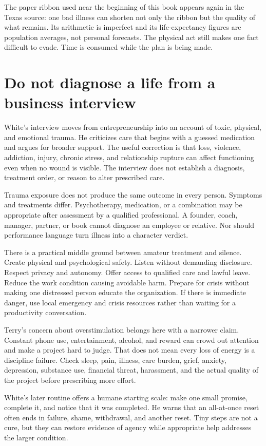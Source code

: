 The paper ribbon used near the beginning of this book appears again in the
Texas source: one bad illness can shorten not only the ribbon but the quality
of what remains. Its arithmetic is imperfect and its life-expectancy figures
are population averages, not personal forecasts. The physical act still makes
one fact difficult to evade. Time is consumed while the plan is being made.

\section{Do not diagnose a life from a business interview}

White's interview moves from entrepreneurship into an account of toxic,
physical, and emotional trauma. He criticizes care that begins with a guessed
medication and argues for broader support. The useful correction is that loss,
violence, addiction, injury, chronic stress, and relationship rupture can
affect functioning even when no wound is visible. The interview does not
establish a diagnosis, treatment order, or reason to alter prescribed care.

Trauma exposure does not produce the same outcome in every person. Symptoms
and treatments differ. Psychotherapy, medication, or a combination may be
appropriate after assessment by a qualified professional. A founder, coach,
manager, partner, or book cannot diagnose an employee or relative. Nor should
performance language turn illness into a character verdict.

There is a practical middle ground between amateur treatment and silence.
Create physical and psychological safety. Listen without demanding disclosure.
Respect privacy and autonomy. Offer access to qualified care and lawful leave.
Reduce the work condition causing avoidable harm. Prepare for crisis without
making one distressed person educate the organization. If there is immediate
danger, use local emergency and crisis resources rather than waiting for a
productivity conversation.

Terry's concern about overstimulation belongs here with a narrower claim.
Constant phone use, entertainment, alcohol, and reward can crowd out attention
and make a project hard to judge. That does not mean every loss of energy is a
discipline failure. Check sleep, pain, illness, care burden, grief, anxiety,
depression, substance use, financial threat, harassment, and the actual quality
of the project before prescribing more effort.

White's later routine offers a humane starting scale: make one small promise,
complete it, and notice that it was completed. He warns that an all-at-once
reset often ends in failure, shame, withdrawal, and another reset. Tiny steps
are not a cure, but they can restore evidence of agency while appropriate help
addresses the larger condition.

